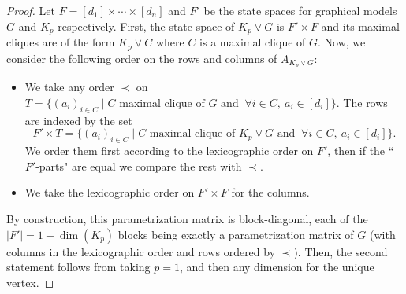 \documentclass[11pt]{amsart}
\numberwithin{equation}{section}
\theoremstyle{plain}
\numberwithin{theorem}{section}
\theoremstyle{definition}
\begin{document}
\begin{proof}Let $F=[d_1]\times\cdots\times[d_n]$ and $F'$ be the state spaces for graphical models $G$ and $K_p$ respectively. First, the state space of $K_p\vee G$ is $F'\times F$ and its maximal cliques are of the form $K_p\vee C$ where $C$ is a maximal clique of $G$. Now, we consider the following order on the rows and columns of $A_{K_p\vee G}$: 

\begin{itemize}
\item We take any order $\prec$ on $T=\{(a_i)_{i\in C}\mid C\text{ maximal clique of }G\text{ and }~\forall i\in C,~a_i\in[d_i]\}$.
The rows are indexed by the set $$F'\times T=\{(a_i)_{i\in C}\mid C\text{ maximal clique of }K_p\vee G\text{ and }~\forall i\in C,~a_i\in[d_i]\}.$$
We order them first according to the lexicographic order on $F'$, then if the ``$F'$-parts" are equal we compare the rest with $\prec$.

\item We take the lexicographic order on $F'\times F$ for the columns.

\end{itemize}

By construction, this parametrization matrix is block-diagonal, each of the $|F'|=1+\dim(K_p)$ blocks being exactly a parametrization matrix of $G$ (with columns in the lexicographic order and rows ordered by $\prec$). Then, the second statement follows from taking $p=1$, and then any dimension for the unique vertex. 
\end{proof}
\end{document}
